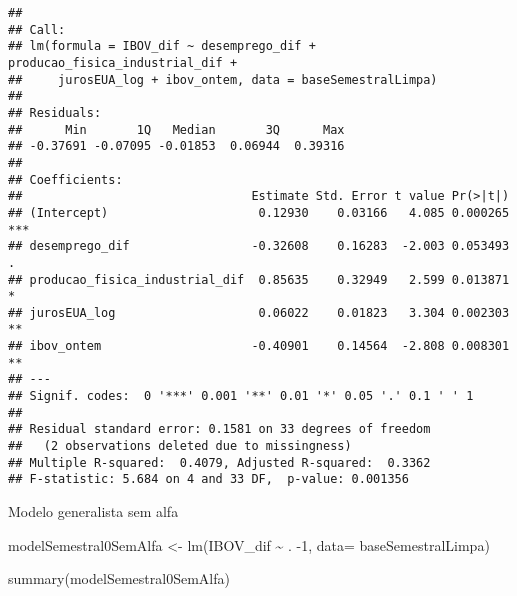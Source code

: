\documentclass[
]{article}
\newenvironment{Shaded}{\begin{snugshade}}{\end{snugshade}}
\newcommand{\AttributeTok}[1]{\textcolor[rgb]{0.77,0.63,0.00}{#1}}
\newcommand{\DecValTok}[1]{\textcolor[rgb]{0.00,0.00,0.81}{#1}}
\newcommand{\FunctionTok}[1]{\textcolor[rgb]{0.00,0.00,0.00}{#1}}
\newcommand{\NormalTok}[1]{#1}
\newcommand{\OtherTok}[1]{\textcolor[rgb]{0.56,0.35,0.01}{#1}}
\newcommand{\SpecialCharTok}[1]{\textcolor[rgb]{0.00,0.00,0.00}{#1}}
\begin{document}
\begin{verbatim}
## 
## Call:
## lm(formula = IBOV_dif ~ desemprego_dif + producao_fisica_industrial_dif + 
##     jurosEUA_log + ibov_ontem, data = baseSemestralLimpa)
## 
## Residuals:
##      Min       1Q   Median       3Q      Max 
## -0.37691 -0.07095 -0.01853  0.06944  0.39316 
## 
## Coefficients:
##                                Estimate Std. Error t value Pr(>|t|)    
## (Intercept)                     0.12930    0.03166   4.085 0.000265 ***
## desemprego_dif                 -0.32608    0.16283  -2.003 0.053493 .  
## producao_fisica_industrial_dif  0.85635    0.32949   2.599 0.013871 *  
## jurosEUA_log                    0.06022    0.01823   3.304 0.002303 ** 
## ibov_ontem                     -0.40901    0.14564  -2.808 0.008301 ** 
## ---
## Signif. codes:  0 '***' 0.001 '**' 0.01 '*' 0.05 '.' 0.1 ' ' 1
## 
## Residual standard error: 0.1581 on 33 degrees of freedom
##   (2 observations deleted due to missingness)
## Multiple R-squared:  0.4079, Adjusted R-squared:  0.3362 
## F-statistic: 5.684 on 4 and 33 DF,  p-value: 0.001356
\end{verbatim}

Modelo generalista sem alfa

\begin{Shaded}
\begin{Highlighting}[]
\NormalTok{modelSemestral0SemAlfa }\OtherTok{\textless{}{-}} \FunctionTok{lm}\NormalTok{(IBOV\_dif }\SpecialCharTok{\textasciitilde{}}\NormalTok{ . }\SpecialCharTok{{-}}\DecValTok{1}\NormalTok{, }\AttributeTok{data=}\NormalTok{ baseSemestralLimpa)}

\FunctionTok{summary}\NormalTok{(modelSemestral0SemAlfa)}
\end{Highlighting}
\end{Shaded}
\end{document}
